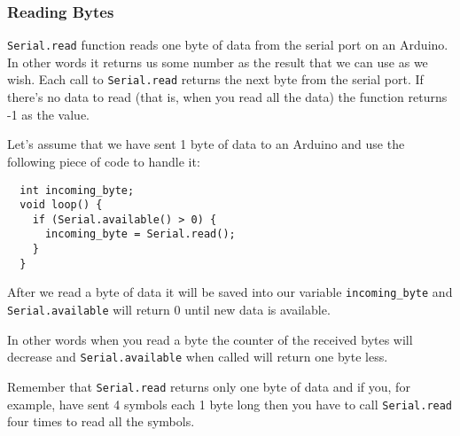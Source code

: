 \documentclass[../sparc.tex]{subfiles}
\begin{document}
\subsubsection{Reading Bytes}

\texttt{Serial.read} function reads one byte of data from the serial port on an
Arduino.  In other words it returns us some number as the result that we can use
as we wish.  Each call to \texttt{Serial.read} returns the next byte from the
serial port.  If there's no data to read (that is, when you read all the data)
the function returns -1 as the value.


Let's assume that we have sent 1 byte of data to an Arduino and use the
following piece of code to handle it:

\begin{verbatim}
  int incoming_byte;
  void loop() {
    if (Serial.available() > 0) {
      incoming_byte = Serial.read();
    }
  }
\end{verbatim}

After we read a byte of data it will be saved into our variable
\texttt{incoming\_byte} and \texttt{Serial.available} will return 0 until new
data is available.

In other words when you read a byte the counter of the received bytes will
decrease and \texttt{Serial.available} when called will return one byte less.

Remember that \texttt{Serial.read} returns only one byte of data and if you, for
example, have sent 4 symbols each 1 byte long then you have to call
\texttt{Serial.read} four times to read all the symbols.
\end{document}
